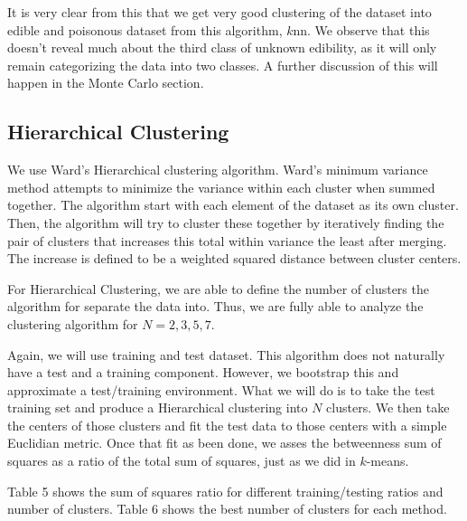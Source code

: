 \documentclass{article}
\begin{document}
It is very clear from this that we get very good clustering of the dataset into edible and poisonous dataset from this algorithm, $k$nn. We observe that this doesn't reveal much about the third class of unknown edibility, as it will only remain categorizing the data into two classes. A further discussion of this will happen in the Monte Carlo section.

\subsection{Hierarchical Clustering}

We use Ward's Hierarchical clustering algorithm. Ward's minimum variance method attempts to  minimize the variance within each cluster when summed together. The algorithm start with each element of the dataset as its own cluster. Then, the algorithm will try to cluster these together by iteratively finding the pair of clusters that increases this total within variance the least after merging. The increase is defined to be a weighted squared distance between cluster centers. 

For Hierarchical Clustering, we are able to define the number of clusters the algorithm for separate the data into. Thus, we are fully able to analyze the clustering algorithm for $N=2,3,5,7$.

Again, we will use training and test dataset. This algorithm does not naturally have a test and a training component. However, we bootstrap this and approximate a test/training environment. What we will do is to take the test training set and produce a Hierarchical clustering into $N$ clusters. We then take the centers of those clusters and fit the test data to those centers with a simple Euclidian metric. Once that fit as been done, we asses the betweenness sum of squares as a ratio of the total sum of squares, just as we did in $k$-means. 

Table 5 shows the sum of squares ratio for different training/testing ratios and number of clusters. Table 6 shows the best number of clusters for each method.
\end{document}
